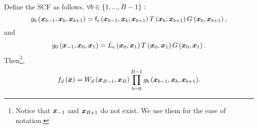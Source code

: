 \documentclass{article}
\begin{document}
Define the \ac{SCF} as follows,
$\forall b\in\left\{ {1,...,B-1}\right\}:$
\begin{equation}
\label{eq:gk}
g_{b}\left({\boldsymbol{x}_{b-1},\boldsymbol{x}_{b},\boldsymbol{x}_{b+1}}\right)= \mathsf{f}_{\text{s}}\left({\boldsymbol{x}_{b-1},\boldsymbol{x}_{b},\boldsymbol{x}_{b+1}}\right) T\left({{\boldsymbol{x}_{b}},{\boldsymbol{x}_{b+1}}}\right)G\left({\boldsymbol{x}_{b},\boldsymbol{x}_{b+1}}\right),
\end{equation}
and
\begin{equation}
\label{eq:g0K}
g_0\left({\boldsymbol{x}_{-1},\boldsymbol{x}_{0},\boldsymbol{x}_{1}}\right)  =  \Bar{L_{\text{e}}}\left({\boldsymbol{x}_{0},\boldsymbol{x}_{1}}\right)T\left({{\boldsymbol{x}_0},{\boldsymbol{x}_{1}}}\right)G\left({\boldsymbol{x}_0,\boldsymbol{x}_{1}}\right).
\end{equation}
Then\footnote{Notice that $\boldsymbol{x}_{-1}$ and $\boldsymbol{x}_{B+1}$ do not exist. We use them for the ease of notation.},
\begin{equation}
\label{eq:cont_func}
f_{d}\left({\Bar{\boldsymbol{x}}}\right) = W_{d}\left({\boldsymbol{x}_{B-1},\boldsymbol{x}_{B}}\right) \prod_{b=0}^{B-1}{g_{b}\left({\boldsymbol{x}_{b-1},\boldsymbol{x}_{b},\boldsymbol{x}_{b+1}}\right)}.
\end{equation}
\end{document}
